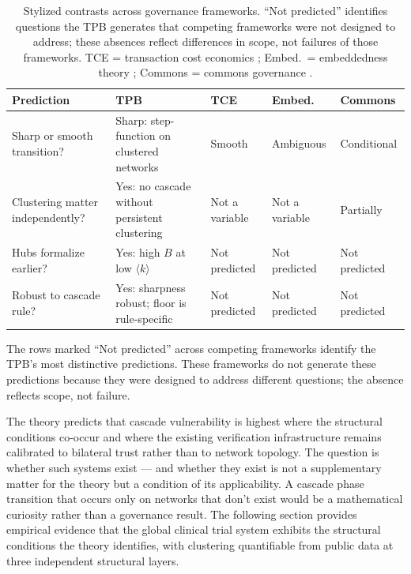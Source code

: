\documentclass[11pt,a4paper]{article}
\begin{document}
\begin{table}[!htbp]
\centering
\footnotesize
\begin{tabularx}{\textwidth}{X X l l l}
\toprule
\textbf{Prediction} & \textbf{TPB} & \textbf{TCE} & \textbf{Embed.} & \textbf{Commons} \\
\midrule
Sharp or smooth transition? & Sharp: step-function on clustered networks & Smooth & Ambiguous & Conditional \\
\addlinespace
Clustering matter independently? & Yes: no cascade without persistent clustering & Not a variable & Not a variable & Partially \\
\addlinespace
Hubs formalize earlier? & Yes: high $B$ at low $\langle k \rangle$ & Not predicted & Not predicted & Not predicted \\
\addlinespace
Robust to cascade rule? & Yes: sharpness robust; floor is rule-specific & Not predicted & Not predicted & Not predicted \\
\bottomrule
\end{tabularx}
\caption{Stylized contrasts across governance frameworks. ``Not predicted'' identifies questions the TPB generates that competing frameworks were not designed to address; these absences reflect differences in scope, not failures of those frameworks. TCE = transaction cost economics \cite{williamson1975}; Embed.\ = embeddedness theory \cite{granovetter1985}; Commons = commons governance \cite{ostrom1990}.}
\label{tab:predictions}
\end{table}

The rows marked ``Not predicted'' across competing frameworks identify the TPB's most distinctive predictions. These frameworks do not generate these predictions because they were designed to address different questions; the absence reflects scope, not failure.

The theory predicts that cascade vulnerability is highest where the structural conditions co-occur and where the existing verification infrastructure remains calibrated to bilateral trust rather than to network topology. The question is whether such systems exist --- and whether they exist is not a supplementary matter for the theory but a condition of its applicability. A cascade phase transition that occurs only on networks that don't exist would be a mathematical curiosity rather than a governance result. The following section provides empirical evidence that the global clinical trial system exhibits the structural conditions the theory identifies, with clustering quantifiable from public data at three independent structural layers.
\end{document}
